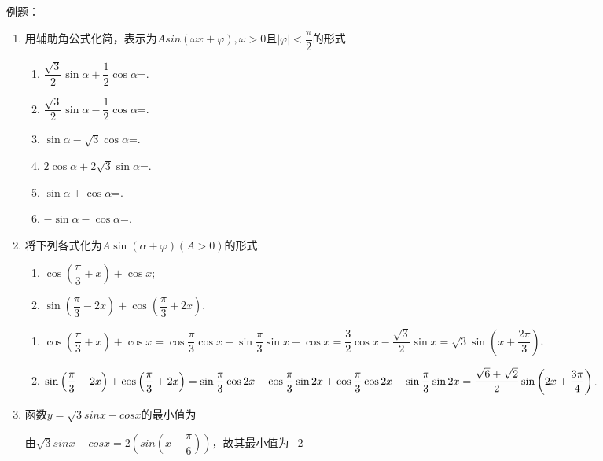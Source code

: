 例题：
\begin{enumerate}
    \item 用辅助角公式化简，表示为$Asin(\omega x + \varphi), \omega > 0 \mbox{且} |\varphi| < \dfrac{\pi}{2}$的形式
    \begin{enumerate}
        \item $\dfrac{\sqrt{3}}{2}\sin\alpha+\dfrac{1}{2}\cos\alpha$=. 
        
        \item $\dfrac{\sqrt{3}}{2}\sin\alpha-\dfrac{1}{2}\cos\alpha$=. 
        
        \item $\sin\alpha-\sqrt{3}\cos\alpha$=. 
        
        \item $2\cos\alpha+2\sqrt{3}\sin\alpha$=. 
        
        \item $\sin\alpha+\cos\alpha$=. 
        
        \item $-\sin\alpha-\cos\alpha$=. 
    \end{enumerate}
    \item 将下列各式化为$A\sin\left(\alpha+\varphi\right)\left(A>0\right)$的形式: 
    \begin{enumerate}[(1)]
    \item $\cos\left(\dfrac{\pi}{3}+x\right)+\cos{x}$; 
    
    \item $\sin\left(\dfrac{\pi}{3}-2x\right)+\cos\left(\dfrac{\pi}{3}+2x\right)$. 
    \end{enumerate}
    \begin{jieda}
    \begin{enumerate}[(1)]
    \item $\cos\left(\dfrac{\pi}{3}+x\right)+\cos{x}=\cos\dfrac{\pi}{3}\cos{x}-\sin\dfrac{\pi}{3}\sin{x}+\cos{x}=\dfrac{3}{2}\cos{x}-\dfrac{\sqrt{3}}{2}\sin{x}=\sqrt{3}\sin\left(x+\dfrac{2\pi}{3}\right)$. 
    
    \item $\sin\left(\dfrac{\pi}{3}-2x\right)+\cos\left(\dfrac{\pi}{3}+2x\right)=\sin\dfrac{\pi}{3}\cos2x-\cos\dfrac{\pi}{3}\sin2x+\cos\dfrac{\pi}{3}\cos2x-\sin\dfrac{\pi}{3}\sin2x\\
    =\dfrac{\sqrt{6}+\sqrt{2}}{2}\sin\left(2x+\dfrac{3\pi}{4}\right)$. 
    \end{enumerate}
    \end{jieda}
    \item 函数$y = \sqrt{3}sinx - cosx$的最小值为
        \begin{jieda}
            由$\sqrt{3}sinx - cosx = 2\left(sin\left(x-\dfrac{\pi}{6}\right)\right)$，故其最小值为$-2$
        \end{jieda}
   

\end{enumerate}
